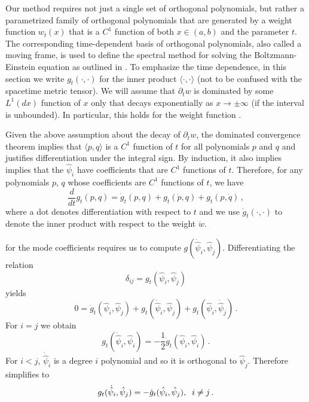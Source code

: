 Our method requires not just a single set of orthogonal polynomials, but rather a parametrized family of orthogonal polynomials that are generated by a weight function $w_t(x)$ that is a $C^1$ function of both $x\in(a,b)$ and the parameter $t$. The corresponding time-dependent basis of orthogonal polynomials, also called a moving frame, is used to define the spectral method for solving the  Boltzmann-Einstein equation as outlined in .  To emphasize the time dependence, in this section we write $g_t(\cdot,\cdot)$ for the inner product $\langle\cdot,\cdot\rangle$ (not to be confused with the spacetime metric tensor).  We will assume that $\partial_t w$ is dominated by some $L^1(dx)$ function of $x$ only that decays exponentially as $x\rightarrow\pm\infty$ (if the interval is unbounded). In particular, this holds for the weight function .

Given the above assumption about the decay of $\partial_t w$, the dominated convergence theorem implies that $\langle p,q\rangle$ is a $C^1$ function of $t$ for all polynomials $p$ and $q$ and justifies  differentiation under the integral sign. By induction, it also implies implies that the $\hat\psi_i$ have coefficients that are $C^1$ functions of $t$. Therefore, for any polynomials $p$, $q$ whose coefficients are $C^1$ functions of $t$, we have
\begin{equation}
\frac{d}{dt}g_t( p,q)=\dot{g}_t(p,q)+g_t(\dot{p},q)+g_t( p,\dot{q})\,,
\end{equation}
where a dot denotes differentiation with respect to $t$ and we use $\dot{g}_t(\cdot,\cdot)$ to denote the inner product with respect to the weight $\dot{w}$.  

 for the mode coefficients requires us to compute $g(\dot{\hat\psi}_i,\hat\psi_j)$.  Differentiating the relation
\begin{equation}
\delta_{ij}=g_t(\hat\psi_i,\hat\psi_j)
\end{equation}
yields
\begin{equation}\label{orthoDerivEq}
0=\dot g_t(\hat\psi_i,\hat\psi_j)+g_t(\dot{\hat\psi}_i,\hat\psi_j)+g_t(\hat\psi_i,\dot{\hat\psi}_j)\,.
\end{equation}
For $i=j$ we obtain
\begin{equation}\label{normDerivEq}
g_t(\dot{\hat\psi}_i,\hat\psi_i)=-\frac{1}{2}\dot{g}_t(\hat\psi_i,\hat\psi_i)\,.
\end{equation}
For $i<j$, $\dot{\hat\psi}_i$ is a degree $i$ polynomial and so it is orthogonal to $\hat\psi_j$. Therefore  simplifies to
\begin{equation}
g_t(\dot{\hat\psi}_i,\hat\psi_j)=-\dot{g}_t(\hat\psi_i,\hat\psi_j),\hspace{2mm} i\neq j\,.
\end{equation}


